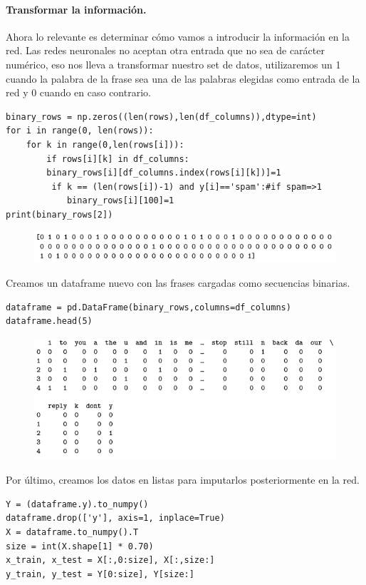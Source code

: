 \documentclass[a4paper,10pt]{article}
\begin{document}
\paragraph{Transformar la información.}
Ahora lo relevante es determinar cómo vamos a introducir la información en la red. Las redes neuronales no aceptan otra entrada que no sea de carácter numérico, eso nos lleva a transformar nuestro set de datos, utilizaremos un 1 cuando la palabra de la frase sea una de las palabras elegidas como entrada de la red y 0 cuando en caso contrario.
\begin{lstlisting}
binary_rows = np.zeros((len(rows),len(df_columns)),dtype=int) 
for i in range(0, len(rows)): 
    for k in range(0,len(rows[i])):
        if rows[i][k] in df_columns: 
	    binary_rows[i][df_columns.index(rows[i][k])]=1
         if k == (len(rows[i])-1) and y[i]=='spam':#if spam=>1 
            binary_rows[i][100]=1
print(binary_rows[2])
\end{lstlisting}
\begin{figure}[H]
\centering
\includegraphics[scale=0.83]{Annotation 2020-03-23 182035.png}
\end{figure}
Creamos un dataframe nuevo con las frases cargadas como secuencias binarias.
\begin{lstlisting}
dataframe = pd.DataFrame(binary_rows,columns=df_columns) 
dataframe.head(5)
\end{lstlisting}
\begin{figure}[H]
\centering
\includegraphics[scale=0.83]{Annotation 2020-03-23 182154.png}
\end{figure}
Por último, creamos los datos en listas para imputarlos posteriormente en la red.
\begin{lstlisting}
Y = (dataframe.y).to_numpy() 
dataframe.drop(['y'], axis=1, inplace=True)
X = dataframe.to_numpy().T 
size = int(X.shape[1] * 0.70) 
x_train, x_test = X[:,0:size], X[:,size:] 
y_train, y_test = Y[0:size], Y[size:]
\end{lstlisting}
\end{document}

